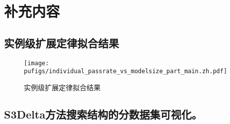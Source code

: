 
\chapter{补充内容}

\section{实例级扩展定律拟合结果}
\begin{figure}[htbp]
  \centering
  \texttt{[image: pufigs/individual\_passrate\_vs\_modelsize\_part\_main.zh.pdf]}
  \caption{实例级扩展定律拟合结果}
  \label{fig:idp_with_modelsize_part1}
\end{figure}

\vspace{-0.3cm}
\section{S3Delta方法搜索结构的分数据集可视化。}



